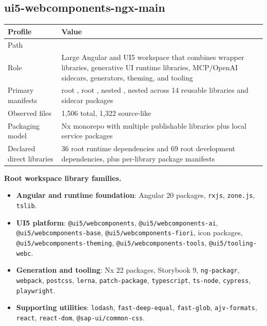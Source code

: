 \documentclass[11pt,a4paper]{article}
\begin{document}
\subsection{ui5-webcomponents-ngx-main}

\begin{tabular}{@{}P{4.2cm}P{9.8cm}@{}}
\toprule
\textbf{Profile} & \textbf{Value} \\
\midrule
Path &  \\
Role & Large Angular and UI5 workspace that combines wrapper libraries, generative UI runtime libraries, MCP/OpenAI sidecars, generators, theming, and tooling \\
Primary manifests & root , root , nested , nested  across 14 reusable libraries and sidecar packages \\
Observed files & 1,506 total, 1,322 source-like \\
Packaging model & Nx monorepo with multiple publishable libraries plus local service packages \\
Declared direct libraries & 36 root runtime dependencies and 69 root development dependencies, plus per-library package manifests \\
\bottomrule
\end{tabular}

\textbf{Root workspace library families.}
\begin{itemize}[leftmargin=*]
    \item \textbf{Angular and runtime foundation}: Angular 20 packages, \texttt{rxjs}, \texttt{zone.js}, \texttt{tslib}.
    \item \textbf{UI5 platform}: \texttt{@ui5/webcomponents}, \texttt{@ui5/webcomponents-ai}, \texttt{@ui5/webcomponents-base}, \texttt{@ui5/webcomponents-fiori}, icon packages, \texttt{@ui5/webcomponents-theming}, \texttt{@ui5/webcomponents-tools}, \texttt{@ui5/tooling-webc}.
    \item \textbf{Generation and tooling}: Nx 22 packages, Storybook 9, \texttt{ng-packagr}, \texttt{webpack}, \texttt{postcss}, \texttt{lerna}, \texttt{patch-package}, \texttt{typescript}, \texttt{ts-node}, \texttt{cypress}, \texttt{playwright}.
    \item \textbf{Supporting utilities}: \texttt{lodash}, \texttt{fast-deep-equal}, \texttt{fast-glob}, \texttt{ajv-formats}, \texttt{react}, \texttt{react-dom}, \texttt{@sap-ui/common-css}.
\end{itemize}
\end{document}
